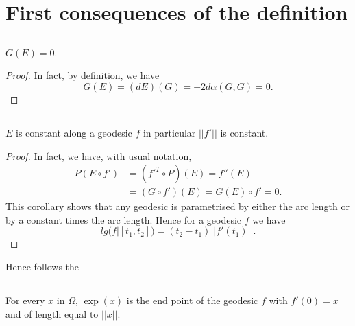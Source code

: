 \section{First consequences of the definition}
\label{chap4:chap4-sec3}\pageoriginale

\subsection{}\label{chap4:4.3.1}

\begin{prop*}
$G(E)=0$.
\end{prop*}

\begin{proof}
In fact, by definition, we have
$$
G(E)=(dE)(G)=-2d\alpha(G,G)=0.
$$
\end{proof}

\subsection{}\label{chap4:4.3.2}

\begin{coro*}
$E$ is constant along a geodesic $f$ in particular $||f'||$ is constant.
\end{coro*}

\begin{proof}
In fact, we have, with usual notation,
\begin{align*}
P(E\circ f') &= ({f'}^{T}\circ P)(E)=f''(E)\\
             &= (G\circ f')(E)=G(E)\circ f'=0.
\end{align*}
This corollary shows that any geodesic is parametrised by either the
arc length or by a constant times the arc length. Hence for a geodesic
$f$ we have
\begin{equation*}
lg(f|[t_{1},t_{2}])=(t_{2}-t_{1})||f'(t_{1})||.\tag{4.3.3}\label{chap4:4.3.3}
\end{equation*}
\end{proof}

Hence follows the

\setcounter{subsection}{3}

\subsection{}\label{chap4:4.3.4}

\begin{coro*}
For every $x$ in $\Omega$, $\exp(x)$ is the end point of the geodesic
$f$ with $f'(0)=x$ and of length equal to $||x||$.
\end{coro*}

